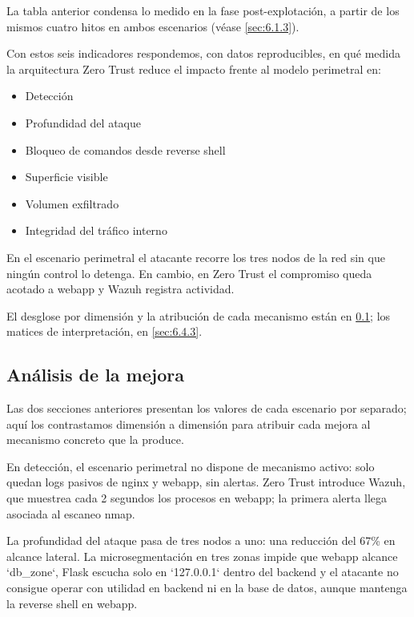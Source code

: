\documentclass[11pt,spanish,listoffigures,listoftables]{tfgetsinf}
\begin{document}
        La tabla anterior condensa lo medido en la fase post-explotación, a partir de los mismos cuatro hitos en ambos escenarios (véase \cref{sec:6.1.3}). 

        Con estos seis indicadores respondemos, con datos reproducibles, en qué medida la arquitectura Zero Trust reduce el impacto frente al modelo perimetral en:
        \begin{itemize}
            \item Detección
            \item Profundidad del ataque
            \item Bloqueo de comandos desde reverse shell
            \item Superficie visible
            \item Volumen exfiltrado
            \item Integridad del tráfico interno
        \end{itemize}
        
        En el escenario perimetral el atacante recorre los tres nodos de la red sin que ningún control lo detenga. En cambio, en Zero Trust el compromiso queda acotado a webapp y Wazuh registra actividad. 
        
        El desglose por dimensión y la atribución de cada mecanismo están en \cref{sec:6.4.2}; los matices de interpretación, en \cref{sec:6.4.3}.
        
        \subsection{Análisis de la mejora}
        \label{sec:6.4.2}

        Las dos secciones anteriores presentan los valores de cada escenario por separado; aquí los contrastamos dimensión a dimensión para atribuir cada mejora al mecanismo concreto que la produce.

        En detección, el escenario perimetral no dispone de mecanismo activo: solo quedan logs pasivos de nginx y webapp, sin alertas. Zero Trust introduce Wazuh, que muestrea cada 2 segundos los procesos en webapp; la primera alerta llega asociada al escaneo nmap.

        La profundidad del ataque pasa de tres nodos a uno: una reducción del 67\% en alcance lateral. La microsegmentación en tres zonas impide que webapp alcance `db\_zone`, Flask escucha solo en `127.0.0.1` dentro del backend y el atacante no consigue operar con utilidad en backend ni en la base de datos, aunque mantenga la reverse shell en webapp.
        
\end{document}
